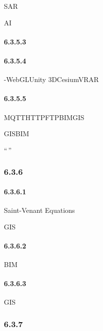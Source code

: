 SAR

AI

\hypertarget{section-80}{%
\paragraph{6.3.5.3}\label{section-80}}

\hypertarget{section-81}{%
\paragraph{6.3.5.4}\label{section-81}}

-WebGLUnity 3DCesiumVRAR

\hypertarget{section-82}{%
\paragraph{6.3.5.5}\label{section-82}}

MQTTHTTPFTPBIMGIS

GISBIM

``\,''

\hypertarget{section-83}{%
\subsubsection{6.3.6}\label{section-83}}

\hypertarget{section-84}{%
\paragraph{6.3.6.1}\label{section-84}}

Saint-Venant Equations

GIS

\hypertarget{section-85}{%
\paragraph{6.3.6.2}\label{section-85}}

BIM

\hypertarget{section-86}{%
\paragraph{6.3.6.3}\label{section-86}}

GIS

\hypertarget{section-87}{%
\subsubsection{6.3.7}\label{section-87}}

